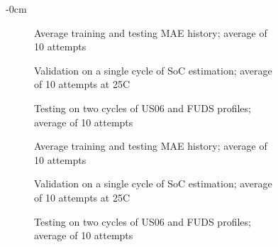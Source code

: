 \begin{figure}[H]
    \centering
    \begin{adjustwidth}{-\extralength}{0cm}
    \begin{subfigure}[b]{0.425\textwidth}
        \centering
        
        \caption{Average training and testing MAE history; average of 10 attempts}
    \end{subfigure}
    \hfill
    \begin{subfigure}[b]{0.425\textwidth}
        \centering
        
        \caption{Validation on a single cycle of SoC estimation; average of 10 attempts at 25\textdegree{}C}
    \end{subfigure}
    \hfill
    \begin{subfigure}[b]{0.425\textwidth}
        \centering
        
        \caption{Testing on two cycles of US06 and FUDS profiles; average of 10 attempts}
        \label{subfig:Model-2res-DSTvsFUDS}
    \end{subfigure}
    \begin{subfigure}[b]{0.425\textwidth}
        \centering
        
        \caption{Average training and testing MAE history; average of 10 attempts}
    \end{subfigure}
    \hfill
    \begin{subfigure}[b]{0.425\textwidth}
        \centering
        
        \caption{Validation on a single cycle of SoC estimation; average of 10 attempts at 25\textdegree{}C}
    \end{subfigure}
    \hfill
    \begin{subfigure}[b]{0.425\textwidth}
        \centering
        
        \caption{Testing on two cycles of US06 and FUDS profiles; average of 10 attempts}
    \end{subfigure}
    \begin{subfigure}[b]{0.425\textwidth}
        \centering
        

\end{subfigure}
\end{adjustwidth}
\end{figure}
